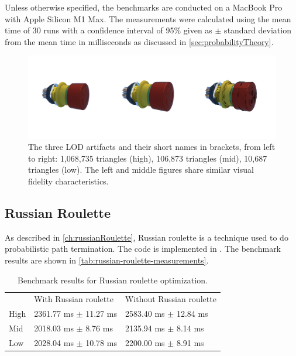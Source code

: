 Unless otherwise specified, the benchmarks are conducted on a MacBook Pro with Apple Silicon M1 Max. The measurements were calculated using the mean time of 30 runs with a confidence interval of 95\% given as $\pm$ standard deviation from the mean time in milliseconds as discussed in \autoref{sec:probabilityTheory}.

\begin{figure}[H]
    \includegraphics[width=0.9\columnwidth]{resources/benchmark-models.png}
    \caption{The three LOD artifacts and their short names in brackets, from left to right: 1,068,735 triangles (high), 106,873 triangles (mid), 10,687 triangles (low). The left and middle figures share similar visual fidelity characteristics.}
    \label{fig:benchmark-models}
\end{figure}

\subsection{Russian Roulette}

As described in \autoref{ch:russianRoulette}, Russian roulette is a technique used to do probabilistic path termination. The code is implemented in . The benchmark results are shown in \autoref{tab:russian-roulette-measurements}.

\begin{table}[H]
    \centering
    \begin{tabular}{@{}lll@{}}
    \toprule
    & With Russian roulette & Without Russian roulette \\
    High & 2361.77 ms $\pm$ 11.27 ms & 2583.40 ms $\pm$ 12.84 ms \\
    Mid & 2018.03 ms $\pm$ 8.76 ms & 2135.94 ms $\pm$ 8.14 ms \\
    Low & 2028.04 ms $\pm$ 10.78 ms & 2200.00 ms $\pm$ 8.91 ms \\
    \bottomrule
    \end{tabular}
    \caption{Benchmark results for Russian roulette optimization.}
    \label{tab:russian-roulette-measurements}
\end{table}

